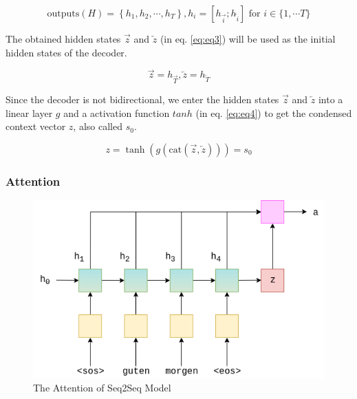 \begin{equation}
    \text{outputs} (H) = \left\{h_1, h_2, \cdots, h_T\right\}, h_i = [h_{\overrightarrow{i}}; h_{\overleftarrow{i}}] \text{ for } i \in \{1,\cdots T\}
    \label{eq:eq2}
\end{equation}

The obtained hidden states $\overrightarrow{z}$ and $\overleftarrow{z}$ (in eq. \ref{eq:eq3}) will be used as the initial hidden states of the decoder. 

\begin{equation}
    \overrightarrow{z} = h_{\overrightarrow{T}},
    \overleftarrow{z} = h_{\overleftarrow{T}}
    \label{eq:eq3}
\end{equation}

Since the decoder is not bidirectional, we enter the hidden states $\overrightarrow{z}$ and $\overleftarrow{z}$ into a linear layer $g$ and a activation function $tanh$ (in eq. \ref{eq:eq4}) to get the condensed context vector $z$, also called $s_0$.

\begin{equation}
    z = \tanh(g(\text{cat}(\overrightarrow{z}, \overleftarrow{z}))) = s_0
    \label{eq:eq4}
\end{equation}

\subsubsection{Attention}

\begin{figure}[h]
	\centering
	\includegraphics[scale=0.7]{../images/seq2seq_encoder_attention.png}
    \caption{The Attention of Seq2Seq Model}
	\label{fig:seq2seq_attention}
\end{figure}

